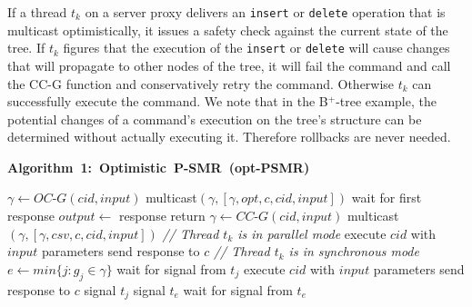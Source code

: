 \documentclass[conference]{IEEEtran}
\begin{document}
If a thread $t_k$ on a server proxy delivers an \texttt{insert} or \texttt{delete} operation that is multicast optimistically, it issues a safety check against the current state of the tree. If $t_k$ figures that the execution of the \texttt{insert} or \texttt{delete} will cause changes that will propagate to other nodes of the tree, it will fail the command and call the CC-G function and conservatively retry the command. Otherwise $t_k$ can successfully execute the command. We note that in the B$^+$-tree example, the potential changes of a command's execution on the tree's structure can be determined without actually executing it. Therefore rollbacks are never needed. 
\begin{algorithm}
\small
\mbox{\textbf{Algorithm 1: Optimistic P-SMR (opt-PSMR)}}
\begin{distribalgo}[1]
\vspace{-3mm}
	\STATE $\gamma \leftarrow \textit{OC-G}(cid, \mathit{input})$
	\STATE multicast$(\gamma, [\gamma, \mathit{opt}, c, cid, \mathit{input}])$
	\STATE wait for first response
	\STATE $\mathit{output} \leftarrow$ response
	\STATE return
\ENDINDENT
\vspace{1.5mm}
\STATE $\gamma \leftarrow \textit{CC-G}(cid, \mathit{input})$
							\STATE multicast$(\gamma, [\gamma, \mathit{csv}, c, cid, \mathit{input}])$
\ENDIF					
				\ENDIF	
			\STATE \emph{// Thread $t_k$ is in parallel mode}
			\STATE execute $cid$ with $\mathit{input}$ parameters
			\STATE send response to $c$
		\ELSE
			\STATE \emph{// Thread $t_k$ is in synchronous mode}
			\STATE $e \leftarrow min\{ j : g_j \in \gamma\}$
					\STATE wait for signal from $t_j$
				\ENDINDENT		
				\STATE execute $cid$ with $\mathit{input}$ parameters
				\STATE send response to $c$
					\STATE signal $t_j$
				\ENDINDENT		
			\ELSE
				\STATE signal $t_e$
				\STATE wait for signal from $t_e$
			\ENDIF
		\ENDIF
	\ENDINDENT
\ENDINDENT
\end{distribalgo}
\label{psmralg}
\end{algorithm}
\end{document}
